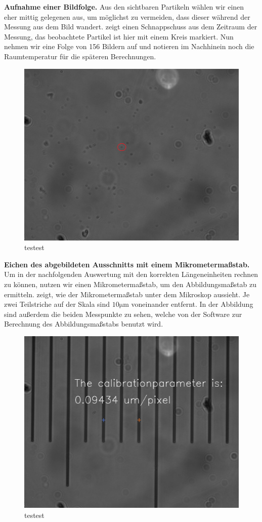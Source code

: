 \textbf{Aufnahme einer Bildfolge.} Aus den sichtbaren Partikeln wählen wir einen eher mittig gelegenen aus, um möglichst zu vermeiden, dass dieser während der Messung aus dem Bild wandert.  zeigt einen Schnappschuss aus dem Zeitraum der Messung, das beobachtete Partikel ist hier mit einem Kreis markiert. Nun nehmen wir eine Folge von 156 Bildern auf und notieren im Nachhinein noch die Raumtemperatur für die späteren Berechnungen.

\begin{figure}[H]
  \centering
  \includegraphics[width=.66\textwidth]{files/Bild105.png}
  \caption{testest}
  \label{fig:bild105}
\end{figure}

\textbf{Eichen des abgebildeten Ausschnitts mit einem Mikrometermaßstab.} Um in der nachfolgenden Auswertung mit den korrekten Längeneinheiten rechnen zu können, nutzen wir einen Mikrometermaßstab, um den Abbildungsmaßstab zu ermitteln.  zeigt, wie der Mikrometermaßstab unter dem Mikroskop aussieht. Je zwei Teilstriche auf der Skala sind $10\si{\micro\meter}$ voneinander entfernt. In der Abbildung sind außerdem die beiden Messpunkte zu sehen, welche von der Software zur Berechnung des Abbildungsmaßstabs benutzt wird.

\begin{figure}[H]
  \centering
  \includegraphics[width=.66\textwidth]{files/Calibration.png}
  \caption{testest}
  \label{fig:calibration}
\end{figure}

